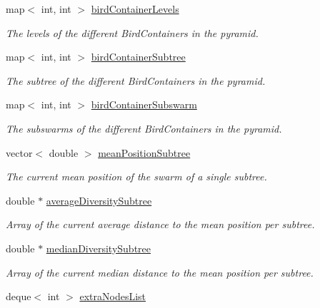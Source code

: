 \begin{CompactItemize}
map$<$ int, int $>$ \hyperlink{classPyramidSwarm_d61fc84d8f5bdb25d1e008e181f695bb}{birdContainerLevels}
\begin{CompactList}\small\item\em The levels of the different BirdContainers in the pyramid. \item\end{CompactList}\item 
map$<$ int, int $>$ \hyperlink{classPyramidSwarm_83d8908955ebd7310ec71678312b3948}{birdContainerSubtree}
\begin{CompactList}\small\item\em The subtree of the different BirdContainers in the pyramid. \item\end{CompactList}\item 
map$<$ int, int $>$ \hyperlink{classPyramidSwarm_5e30f75b1ffdf42ce0d17b6473df1e16}{birdContainerSubswarm}
\begin{CompactList}\small\item\em The subswarms of the different BirdContainers in the pyramid. \item\end{CompactList}\item 
vector$<$ double $>$ \hyperlink{classPyramidSwarm_a9e6c7b093b4043e6f918e137c77e6de}{meanPositionSubtree}
\begin{CompactList}\small\item\em The current mean position of the swarm of a single subtree. \item\end{CompactList}\item 
double $\ast$ \hyperlink{classPyramidSwarm_09297866e64a19ada0b4898c69bbbd3a}{averageDiversitySubtree}
\begin{CompactList}\small\item\em Array of the current average distance to the mean position per subtree. \item\end{CompactList}\item 
double $\ast$ \hyperlink{classPyramidSwarm_309cbc58b3d57d9d0938b29f9c6a3370}{medianDiversitySubtree}
\begin{CompactList}\small\item\em Array of the current median distance to the mean position per subtree. \item\end{CompactList}\item 
deque$<$ int $>$ \hyperlink{classPyramidSwarm_6f8b00d4901f590cb7cc0fe78da593dc}{extraNodesList}

\end{CompactItemize}

